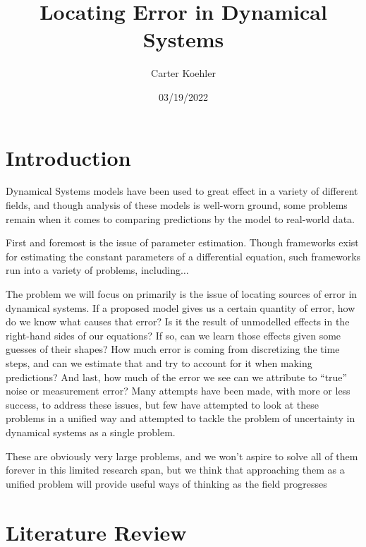 \documentclass[12pt]{article}
\author{Carter Koehler}
\title{Locating Error in Dynamical Systems}
\date{03/19/2022}
\begin{document}
\maketitle



\begin{abstract}
  
\end{abstract}


\section{Introduction}

Dynamical Systems models have been used to great effect in a variety of different fields, and though analysis of these models is well-worn ground, some problems remain when it comes to comparing predictions by the model to real-world data.


First and foremost is the issue of parameter estimation. Though frameworks exist for estimating the constant parameters of a differential equation, such frameworks run into a variety of problems, including$\ldots$


The problem we will focus on primarily is the issue of locating sources of error in dynamical systems. If a proposed model gives us a certain quantity of error, how do we know what causes that error? Is it the result of unmodelled effects in the right-hand sides of our equations? If so, can we learn those effects given some guesses of their shapes? How much error is coming from discretizing the time steps, and can we estimate that and try to account for it when making predictions? And last, how much of the error we see can we attribute to ``true'' noise or measurement error? Many attempts have been made, with more or less success, to address these issues, but few have attempted to look at these problems in a unified way and attempted to tackle the problem of uncertainty in dynamical systems as a single problem.


These are obviously very large problems, and we won't aspire to solve all of them forever in this limited research span, but we think that approaching them as a unified problem will provide useful ways of thinking as the field progresses



\section{Literature Review}
\end{document}
